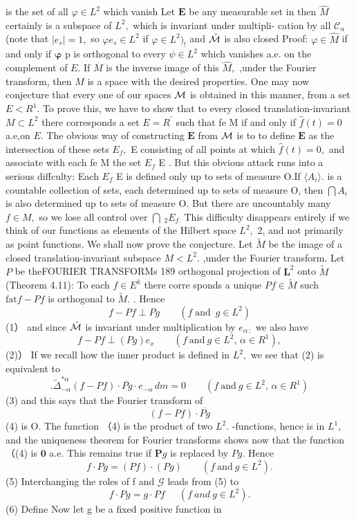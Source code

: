 is the set of all $\varphi\in L^{2}$ which vanish Let $\boldsymbol{E}$ be any measurable set in then $\hat{M}$ certainly is a subspace of $L^{2},$ which is invariant under multipli- cation by all ${\mathcal{C}}_{\alpha}$ (note that $|e_{s}|=1,$ so $\varphi e_{s}\in L^{2}$ if $\varphi\in L^{2})_{!}$ and $\hat{\cal M}$ is also closed Proof: $\varphi\in{\hat{M}}$ if and only if $\boldsymbol{\varphi}$ p is orthogonal to every $\psi\in L^{2}$ which vanishes a.e. on the complement of $\textstyle E.$ If $\textstyle{M}$ is the inverse image of this ${\hat{M}},$ ,under the Fourier transform, then $\textstyle{M}$ is a space with the desired properties. One may now conjecture that every one of our spaces ${\cal{M}}$ is obtained in this manner, from a set $E<R^{1}.$ To prove this, we have to show that to every closed translation-invariant $M\subset L^{2}$ there corresponds a set $E=R^{\prime}$ such that fe M if and only if ${\hat{f}}(t)=0$ a.e,on $\textstyle E.$ The obvious way of constructing $\boldsymbol{E}$ from ${\cal M}$ is to to define $\boldsymbol{E}$ as the intersection of these sets $E_{f},$ E consisting of all points at which ${\hat{f}}(t)=0,$ and associate with each fe M the set $E_{f}$ E . But this obvious attack runs into a serious diffculty: Each $E_{f}$ E is defined only up to sets of measure O.If $\langle A_{i}\rangle.$ is a countable collection of sets, each determined up to sets of measure O, then $\bigcap A_{i}$ is also determined up to sets of measure O. But there are uncountably many $f\in M,$ so we lose all control over $\bigcap{\ }_{2}E_{f.}$ This difficulty disappears entirely if we think of our functions as elements of the Hilbert space $L^{2},$ 2, and not primarily as point functions. We shall now prove the conjecture. Let $\tilde{M}$ be the image of a closed translation-invariant subspace $M<L^{2}.$ ,under the Fourier transform. Let ${\mathbf{}}P$ be theFOURIER TRANSFORMs 189 orthogonal projection of ${\boldsymbol{L}}^{2}$ onto $\tilde{M}$ (Theorem 4.11): To each $\scriptstyle f\in E^{k}$ there corre sponds a unique $P f\in{\tilde{M}}$ such $\mathrm{fat}f-P f$ is orthogonal to ${\widetilde{M}}.$ . Hence $$ f-P f\perp P g\qquad(f\operatorname{and}\ g\in L^{2}) $$ (1） and since $\hat{\cal M}$ is invariant under multiplication by $e_{\alpha\,:}$ we also have $$ f-P f\perp(P g)e_{x}\qquad(f{\mathrm{~and~}}g\in L^{2},\,\alpha\in R^{1}), $$ (2)） If we recall how the inner product is defined in $L^{2},$ we see that (2) is equivalent to $$ .\widetilde{\Delta}_{-\alpha}^{\ast\alpha}(f-P f)\cdot\overline{{{P g}}}\cdot e_{-\alpha}\,d m=0\qquad(f\mathrm{~and~}g\in L^{2},\,\alpha\in R^{1}) $$ (3) and this says that the Fourier transform of $$ (f-P f)\cdot{\overline{{P g}}} $$ (4) is O. The function （4) is the product of two $L^{2}.$ -functions, hence is in $L^{1},$ and the uniqueness theorem for Fourier transforms shows now that the function （(4) is $\mathbf{0}$ a.e. This remains true if ${\boldsymbol{P}}g$ is replaced by $P g.$ Hence $$ f\cdot P g=(P f)\cdot(P g)\qquad(f{\mathrm{~and~}}g\in L^{2}). $$ (5) Interchanging the roles of f and $\scriptstyle{\mathcal{G}}$ leads from (5) to $$ f\cdot P g=g\cdot P f\ ~\quad(f\ a n d~g\in L^{2}). $$ (6) Define Now let g be a fixed positive function in 